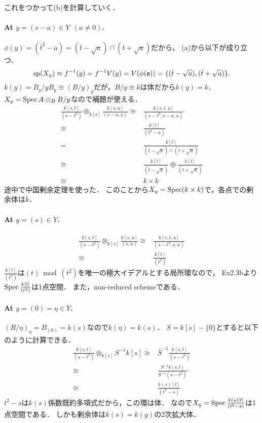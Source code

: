 \documentclass[a4paper]{jsarticle}
\begin{document}
    これをつかって(b)を計算していく．
    \paragraph{At $y=(s-a) \in Y ~~(a \neq 0)$.}
    $\phi(y)=(\bar{t}^2-a)=(\bar{t}-\sqrt{a}) \cap (\bar{t}+\sqrt{a})$だから，
    (a)から以下が成り立つ．
    \[
        \operatorname{sp}(X_y) \approx
        f^{-1}(y)=f^{-1}V(y)=V(\phi(\mathfrak{a}))=\{ (\bar{t}-\sqrt{a}), (\bar{t}+\sqrt{a}) \}.
    \]
    $k(y)=B_y/yB_y \cong (B/y)_{\bar{y}}$だが，$B/y \cong k$は体だから$k(y)=k$．
    $X_y=\operatorname{Spec} A \otimes_B B/y$なので補題が使える．
    \begin{align*}
        \frac{k[s,t]}{(s-t^2)} \otimes_{k[s]} \frac{k[s,u]}{(s-a,u)}
        \cong& \frac{k[s,t,u]}{(s-t^2, s-a, u)} \\
        \cong& \frac{k[t]}{(t^2-a)} \\
        =& \frac{k[t]}{(t-\sqrt{a}) \cap (t+\sqrt{a})} \\
        \cong& \frac{k[t]}{(t-\sqrt{a})} \oplus \frac{k[t]}{(t+\sqrt{a})} \\
        \cong& k \times k
    \end{align*}
    途中で中国剰余定理を使った．
    このことから$X_y=\operatorname{Spec} (k \times k)$で，各点での剰余体は$k$．

    \paragraph{At $y=(s) \in Y$.}
    \begin{align*}
        \frac{k[s,t]}{(s-t^2)} \otimes_{k[s]} \frac{k[s,u]}{(s,u)}
        \cong& \frac{k[s,t,u]}{(s-t^2, s, u)} \\
        \cong& \frac{k[t]}{(t^2)}
    \end{align*}
    $\frac{k[t]}{(t^2)}$は$(t) \bmod (t^2)$を唯一の極大イデアルとする局所環なので，
    Ex2.3bより$\operatorname{Spec} \frac{k[t]}{(t^2)}$は1点空間．
    また，non-reduced schemeである．

    \paragraph{At $y=(0)=\eta \in Y$.}
    $(B/\eta)_{\eta}=B_{(0)}=k(s)$なので$k(\eta)=k(s)$．
    $S=k[s]-\{0\}$とすると以下のように計算できる．
    \begin{align*}
        \frac{k[s,t]}{(s-t^2)} \otimes_{k[s]} S^{-1}k[s]
        \cong& \bar{S}^{-1} \frac{k[s,t]}{(s-t^2)} \\
        \cong& \frac{S^{-1}k[s,t]}{S^{-1} (s-t^2)} \\
        \cong& \frac{k(s)[t]}{(t^2-s)}
    \end{align*}
    $t^2-s$は$k(s)$係数既約多項式だから，この環は体．
    なので$X_y=\operatorname{Spec} \frac{k(s)[t]}{(t^2-s)}$は1点空間である．
    しかも剰余体は$k(s)=k(y)$の2次拡大体．
\end{document}
